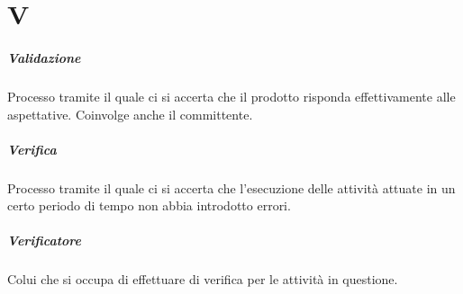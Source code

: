 \chapter{V}

\paragraph*{Validazione}
Processo tramite il quale ci si accerta che il prodotto risponda effettivamente alle aspettative. Coinvolge anche il committente.

\paragraph*{Verifica}
Processo tramite il quale ci si accerta che l'esecuzione delle attività attuate in un certo periodo di tempo non abbia introdotto errori.

\paragraph*{Verificatore}
Colui che si occupa di effettuare di verifica per le attività in questione.